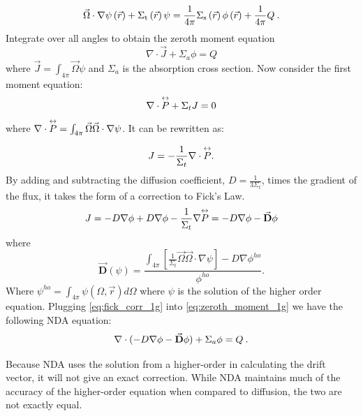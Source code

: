   \begin{equation}
  \vec{\Omega}\cdot \nabla \psi \left(\vec{r}\right)+ \Sigma_{\mathrm{t}}\left(\vec{r}\right)\psi = \frac{1}{4 \pi} \Sigma_{\mathrm{s}}\left(\vec{r}\right) \phi\left(\vec{r}\right) + \frac{1}{4 \pi} Q\:.
  \end{equation}
Integrate over all angles to obtain the zeroth moment equation
\begin{equation}
  \nabla \cdot \vec{J} + \Sigma_a\phi  =  Q
  \label{eq:zeroth_moment_1g}
  \end{equation}
where $\vec{J} = \int_{4\pi} \vec{\Omega}\psi$ and $\Sigma_a$ is the absorption cross section.   Now consider the first moment equation:
  \begin{equation}
  \nabla \cdot \overset{\text{\scriptsize$\leftrightarrow$}}{P} + \Sigma_t J = 0
  \end{equation}
where $\nabla \cdot \overset{\text{\scriptsize$\leftrightarrow$}}{P} =  \int_{4\pi} \vec{\Omega} \vec{\Omega} \cdot \nabla \psi$. It can be rewritten as: 

  \begin{equation}
  J= -\frac{1}{\Sigma_t} \nabla \cdot \overset{\text{\scriptsize$\leftrightarrow$}}{P}. 
  \end{equation}
  By adding and subtracting the diffusion coefficient, $D = \frac{1}{3\Sigma_t}$, times the gradient of the flux, it takes the form of a correction to Fick's Law. 
  \begin{equation}
  J = -D \nabla \phi + D \nabla \phi - \frac{1}{\Sigma_t} \nabla \overset{\text{\scriptsize$\leftrightarrow$}}{P} \\
  = -D \nabla \phi - \vec{\textbf{D}} \phi
  \label{eq:fick_corr_1g}
  \end{equation}
  where 
 \begin{equation}
  \vec{\textbf{D}} (\psi) = \frac{\int_{4\pi} [\frac{1}{\Sigma_t} \vec{\Omega} \vec{\Omega}\cdot \nabla \psi] - D \nabla \phi^{ho}}{\phi^{ho}}.
  \label{eq:drift_vector}
  \end{equation} 
Where $\psi^{ho} = \int_{4\pi} \psi(\Omega, \vec{r}) d\Omega$ where $\psi$ is the solution of the higher order equation. Plugging \eqref{eq:fick_corr_1g} into \eqref{eq:zeroth_moment_1g} we have the following NDA equation:
  \begin{equation}
  \nabla\cdot(-D \nabla \phi - \vec{\bf D} \phi) + \Sigma_a \phi = Q \:. \label{eq:NDA_1g}
  \end{equation}
  
Because NDA uses the solution from a higher-order in calculating the drift vector, it will not give an exact correction. While NDA maintains much of the accuracy of the higher-order equation when compared to diffusion, the two are not exactly equal. 


